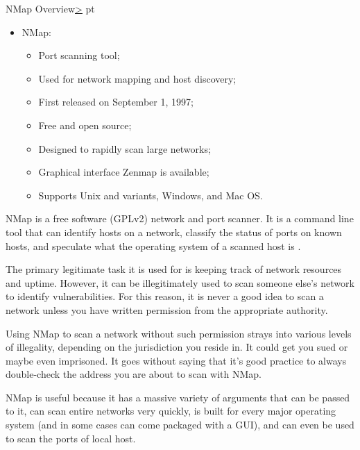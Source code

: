 \documentclass[12pt]{article}
\newenvironment{instructionblock}{\Large\bgroup}{\egroup}
\newcommand{\bi}{\begin{itemize}}
\newcommand{\ei}{\end{itemize}}
\begin{document}

\pagebreak
\tableofcontents


\pagebreak
{}
\setcounter{section}{1}
\begin{slide}{ NMap Overview}{\hyperref[slide 2]{\textgreater}}
    pt
   \begin{instructionblock}
      \begin{itemize}
         \item NMap: 
            \bi
            \item Port scanning tool; 
            \item Used for network mapping and host discovery;
            \item First released on September 1, 1997;
            \item Free and open source;
            \item Designed to rapidly scan large networks;
            \item Graphical interface Zenmap is available;
            \item Supports Unix and variants, Windows, and Mac OS.
            \ei
      \end{itemize}
   \end{instructionblock}
\end{slide}
NMap is a free software (GPLv2) network and port scanner. It is a command line tool that can identify hosts on a network, classify the status of ports on known hosts, and speculate what the operating system of a scanned host is \cite{NMap}. 

The primary legitimate task it is used for is keeping track of network resources and uptime. However, it can be illegitimately used to scan someone else's network to identify vulnerabilities. For this reason, it is never a good idea to scan a network unless you have written permission from the appropriate authority. 

Using NMap to scan a network without such permission strays into various levels of illegality, depending on the jurisdiction you reside in. It could get you sued or maybe even imprisoned. It goes without saying that it's good practice to always double-check the address you are about to scan with NMap.

NMap is useful because it has a massive variety of arguments that can be passed to it, can scan entire networks very quickly, is built for every major operating system (and in some cases can come packaged with a GUI), and can even be used to scan the ports of local host.
\end{document}
